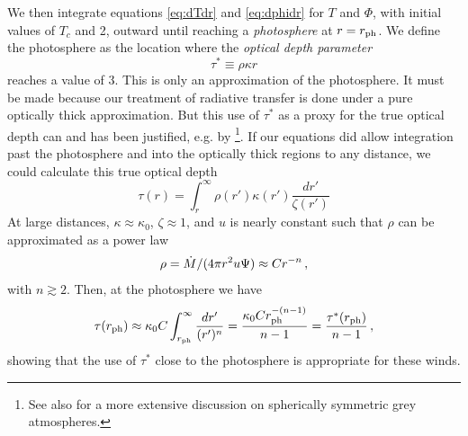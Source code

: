 \documentclass[../main.tex]{subfiles}
\begin{document}
We then integrate equations \eqref{eq:dTdr} and \eqref{eq:dphidr} for $T$ and $\Phi$, with initial values of $T_c$ and 2, outward until reaching a \textit{photosphere} at $r=r_\text{ph}$. We define the photosphere as the location where the \textit{optical depth parameter}
\begin{equation}\label{eq:taustar}
    \tau^*\equiv \rho\kappa r
\end{equation}
reaches a value of 3. This is only an approximation of the photosphere. It must be made because our treatment of radiative transfer is done under a pure optically thick approximation. But this use of $\tau^*$ as a proxy for the true optical depth can and has been justified, e.g. by \citet{Quinn1985}\footnote{See also \citet[Chapter~7.6]{Mihalas1978} for a more extensive discussion on spherically symmetric grey atmospheres.}. If our equations did allow integration past the photosphere and into the optically thick regions to any distance, we could calculate this true optical depth
\begin{equation}\label{eq:trueopticaldepth}
    \tau(r)=\int_r^\infty \rho(r')\kappa(r') \frac{dr'}{\zeta(r')}
\end{equation}
At large distances, $\kappa\approx \kappa_0$, $\zeta\approx 1$, and $u$ is nearly constant such that $\rho$ can be approximated as a power law
\begin{equation}
    \rho = \dot{M}/(4\pi r^2 u\Psi) \approx  Cr^{-n}\,,
\end{equation}
with $n\gtrsim 2$. Then, at the photosphere we have
\begin{equation}\label{eq:tau_taustar_approx}
    \tau(r_\text{ph})\approx\kappa_0C\int_{r_\text{ph}}^\infty \frac{dr'}{(r')^n}=\frac{\kappa_0 Cr_\text{ph}^{-(n-1)}}{n-1}=\frac{\tau^*(r_\text{ph})}{n-1}\,,
\end{equation}
showing that the use of $\tau^*$ close to the photosphere is appropriate for these winds.  
\end{document}
